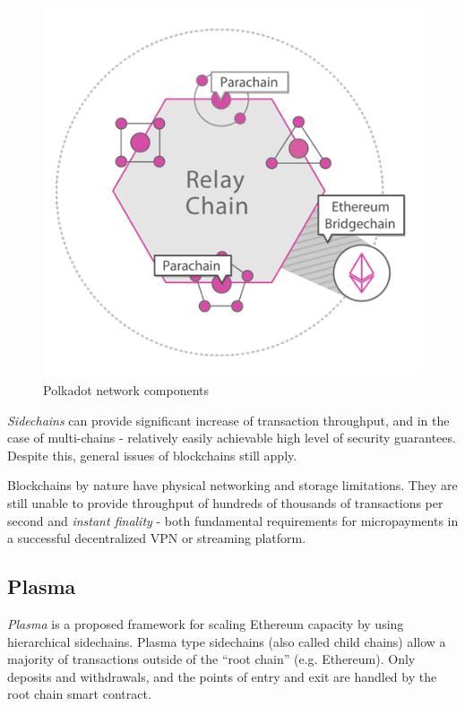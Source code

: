 \documentclass[a4paper,12pt]{article}
\begin{document}
\begin{figure}[H]
    \centering
    \includegraphics[scale=0.5]{../img/polkadot}
    \caption{Polkadot network components}
    \label{img:polkadot}
\end{figure}

\textit{Sidechains} can provide significant increase of transaction throughput, 
and in the case of multi-chains - relatively easily achievable high level of 
security guarantees. Despite this, general issues of blockchains still apply.

Blockchains by nature have physical networking and storage limitations. They are
still unable to provide throughput of hundreds of thousands of transactions per 
second and \textit{instant finality} - both fundamental requirements for 
micropayments in a successful decentralized VPN or streaming platform.

\subsection{Plasma}

\textit{Plasma} \cite{plasma} is a proposed framework for scaling Ethereum 
capacity by using hierarchical sidechains. Plasma type sidechains (also called
child chains) allow a majority of transactions outside of the “root chain” (e.g. 
Ethereum). Only deposits and withdrawals, and the points of entry and exit are 
handled by the root chain smart contract. 
\end{document}
